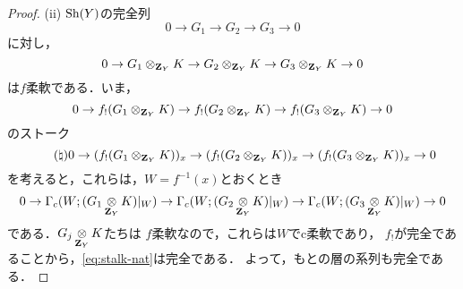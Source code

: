 \begin{proof}
    (ii) 
    \(\mathrm{Sh}(Y)\)の完全列\[
        0\to G_1\to G_2\to G_3\to0
    \]に対し，
    \[
        0\to G_1\otimes_{\mathbf{Z}_Y}K\to G_2\otimes_{\mathbf{Z}_Y}K\to G_3\otimes_{\mathbf{Z}_Y}K\to0
    \]
    は\(f\)柔軟である．いま，
    \[
        0\to f_!(G_1\otimes_{\mathbf{Z}_Y}K)
        \to f_!(G_2\otimes_{\mathbf{Z}_Y}K)
        \to f_!(G_3\otimes_{\mathbf{Z}_Y}K)\to0
    \]
    のストーク
    \[\tag{\(\natural\)}\label{eq:stalk-nat}
        0\to (f_!(G_1\otimes_{\mathbf{Z}_Y}K))_x
        \to (f_!(G_2\otimes_{\mathbf{Z}_Y}K))_x
        \to (f_!(G_3\otimes_{\mathbf{Z}_Y}K))_x\to0
    \]
    を考えると，これらは，\(W=f^{-1}(x)\)とおくとき
    \[
        0\to \Gamma_c(W;(G_1\mathop{\otimes}\limits_{\mathbf{Z}_Y}K)\rvert_{W})
        \to \Gamma_c(W;(G_2\mathop{\otimes}\limits_{\mathbf{Z}_Y}K)\rvert_{W})
        \to \Gamma_c(W;(G_3\mathop{\otimes}\limits_{\mathbf{Z}_Y}K)\rvert_{W})
        \to0
    \]
    である．\(G_j\mathop{\otimes}\limits_{\mathbf{Z}_Y}K\)たちは
    \(f\)柔軟なので，これらは\(W\)でc柔軟であり，
    \(f_!\)が完全であることから，\eqref{eq:stalk-nat}は完全である．
    よって，もとの層の系列も完全である．
\end{proof}

